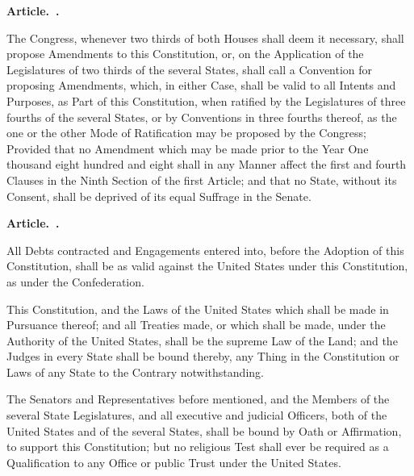 \documentclass[12pt]{article}
\newcounter{article}
\newenvironment{article}
{\stepcounter{article}\setcounter{sect}{0}\begin{center}
{\bf Article.~\Roman{article}.}
\end{center}}
{}
\newcounter{sect}[article]
\begin{document}
\begin{article}
The Congress, whenever two thirds of both Houses shall deem it necessary, shall propose Amendments to this Constitution, or, on the Application of the Legislatures of two thirds of the several States, shall call a Convention for proposing Amendments, which, in either Case, shall be valid to all Intents and Purposes, as Part of this Constitution, when ratified by the Legislatures of three fourths of the several States, or by Conventions in three fourths thereof, as the one or the other Mode of Ratification may be proposed by the Congress; Provided that no Amendment which may be made prior to the Year One thousand eight hundred and eight shall in any Manner affect the first and fourth Clauses in the Ninth Section of the first Article; and that no State, without its Consent, shall be deprived of its equal Suffrage in the Senate.
\end{article}

\begin{article}
All Debts contracted and Engagements entered into, before the Adoption of this Constitution, shall be as valid against the United States under this Constitution, as under the Confederation.

This Constitution, and the Laws of the United States which shall be made in Pursuance thereof; and all Treaties made, or which shall be made, under the Authority of the United States, shall be the supreme Law of the Land; and the Judges in every State shall be bound thereby, any Thing in the Constitution or Laws of any State to the Contrary notwithstanding.

The Senators and Representatives before mentioned, and the Members of the several State Legislatures, and all executive and judicial Officers, both of the United States and of the several States, shall be bound by Oath or Affirmation, to support this Constitution; but no religious Test shall ever be required as a Qualification to any Office or public Trust under the United States.
\end{article}
\end{document}

